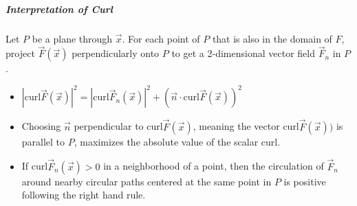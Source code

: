 \documentclass[11pt]{article}
\begin{document}
		\subparagraph{Interpretation of Curl} Let $P$ be a plane through $\vec{x}$. For each point of $P$ that is also in the domain of $F$, project $\vec{F}(\vec{x})$ perpendicularly onto $P$ to get a 2-dimensional vector field $\vec{F}_n$ in $P$.
		\begin{itemize}
			\item $|\text{curl} \vec{F}(\vec{x})|^2 = |\text{curl}\vec{F}_n(\vec{x})|^2 + (\vec{n} \cdot \text{curl}\vec{F}(\vec{x}))^2$
			\item Choosing $\vec{n}$ perpendicular to curl$\vec{F}(\vec{x})$, meaning the vector curl$\vec{F}(\vec{x}))$ is parallel to $P$, maximizes the absolute value of the scalar curl.
			\item If curl$\vec{F}_n(\vec{x}) > 0$ in a neighborhood of a point, then the circulation of $\vec{F}_n$ around nearby circular paths centered at the same point in $P$ is positive following the right hand rule.
		\end{itemize}
%		
%		


\end{document}

